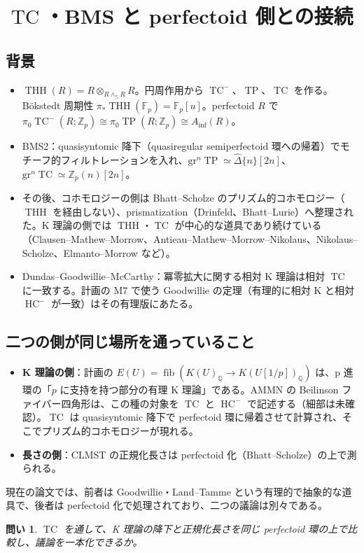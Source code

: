 \documentclass[11pt,a4paper]{ltjsarticle}
\theoremstyle{plain}
\newtheorem{question}{問い}
\theoremstyle{definition}
\theoremstyle{remark}
\newcommand{\Q}{\mathbb{Q}}
\newcommand{\Z}{\mathbb{Z}}
\newcommand{\Sph}{\mathbb{S}}
\newcommand{\THH}{\operatorname{THH}}
\newcommand{\TC}{\operatorname{TC}}
\newcommand{\TP}{\operatorname{TP}}
\newcommand{\HC}{\operatorname{HC}}
\newcommand{\fib}{\operatorname{fib}}
\begin{document}
\section{$\TC$・BMS と perfectoid 側との接続}

\subsection{背景}
\begin{itemize}
  \item $\THH(R) = R \otimes_{R \wedge_{\Sph} R} R$。円周作用から $\TC^-$、$\TP$、$\TC$ を作る。Bökstedt 周期性 $\pi_*\THH(\mathbb{F}_p) = \mathbb{F}_p[u]$。perfectoid $R$ で $\pi_0\TC^-(R;\Z_p) \cong \pi_0\TP(R;\Z_p) \cong A_{\inf}(R)$。
  \item BMS2：quasisyntomic 降下（quasiregular semiperfectoid 環への帰着）でモチーフ的フィルトレーションを入れ、$\mathrm{gr}^n\TP \simeq \widehat{\Delta}\{n\}[2n]$、$\mathrm{gr}^n\TC \simeq \Z_p(n)[2n]$。
  \item その後、コホモロジーの側は Bhatt--Scholze のプリズム的コホモロジー（$\THH$ を経由しない）、prismatization（Drinfeld、Bhatt--Lurie）へ整理された。K 理論の側では $\THH$・$\TC$ が中心的な道具であり続けている（Clausen--Mathew--Morrow、Antieau--Mathew--Morrow--Nikolaus、Nikolaus--Scholze、Elmanto--Morrow など）。
  \item Dundas--Goodwillie--McCarthy：冪零拡大に関する相対 K 理論は相対 $\TC$ に一致する。計画の M7 で使う Goodwillie の定理（有理的に相対 K と相対 $\HC^-$ が一致）はその有理版にあたる。
\end{itemize}

\subsection{二つの側が同じ場所を通っていること}
\begin{itemize}
  \item \textbf{K 理論の側}：計画の $E(U) = \fib(K(U)_\Q \to K(U[1/p])_\Q)$ は、p 進環の「$p$ に支持を持つ部分の有理 K 理論」である。AMMN の Beilinson ファイバー四角形は、この種の対象を $\TC$ と $\HC^-$ で記述する（細部は未確認）。$\TC$ は quasisyntomic 降下で perfectoid 環に帰着させて計算され、そこでプリズム的コホモロジーが現れる。
  \item \textbf{長さの側}：CLMST の正規化長さは perfectoid 化（Bhatt--Scholze）の上で測られる。
\end{itemize}
現在の論文では、前者は Goodwillie・Land--Tamme という有理的で抽象的な道具で、後者は perfectoid 化で処理されており、二つの議論は別々である。
\begin{question}
$\TC$ を通して、K 理論の降下と正規化長さを同じ perfectoid 環の上で比較し、議論を一本化できるか。
\end{question}
\end{document}
